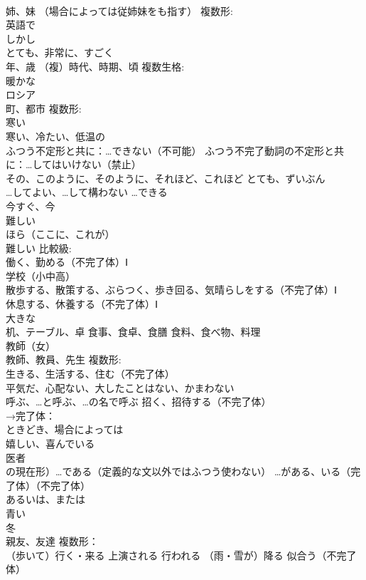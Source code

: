 \documentclass[8pt]{extreport}
\begin{document}
\begin{CJK}{UTF8}{min}
\\	姉、妹 （場合によっては従姉妹をも指す） 複数形:
\\	英語で
\\	しかし
\\	とても、非常に、すごく
\\	年、歳 （複）時代、時期、頃 複数生格:
\\	暖かな
\\	ロシア
\\	町、都市 複数形:
\\	寒い
\\	寒い、冷たい、低温の
\\	ふつう不定形と共に：…できない（不可能） ふつう不完了動詞の不定形と共に：…してはいけない（禁止）
\\	その、このように、そのように、それほど、これほど とても、ずいぶん
\\	…してよい、…して構わない …できる
\\	今すぐ、今
\\	難しい
\\	ほら（ここに、これが）
\\	難しい 比較級:
\\	働く、勤める（不完了体）Ⅰ
\\	学校（小中高）
\\	散歩する、散策する、ぶらつく、歩き回る、気晴らしをする（不完了体）Ⅰ
\\	休息する、休養する（不完了体）Ⅰ
\\	大きな
\\	机、テーブル、卓 食事、食卓、食膳 食料、食べ物、料理
\\	教師（女）
\\	教師、教員、先生 複数形:
\\	生きる、生活する、住む（不完了体） 
\\	平気だ、心配ない、大したことはない、かまわない
\\	呼ぶ、…と呼ぶ、…の名で呼ぶ 招く、招待する（不完了体） 
\\	→完了体：
\\	ときどき、場合によっては
\\	嬉しい、喜んでいる
\\	医者
\\	の現在形）…である（定義的な文以外ではふつう使わない） …がある、いる（完了体）（不完了体）
\\	あるいは、または
\\	青い
\\	冬
\\	親友、友達 複数形：
\\	[定]（歩いて）行く・来る 上演される 行われる （雨・雪が）降る 似合う（不完了体） 

\end{CJK}
\end{document}
